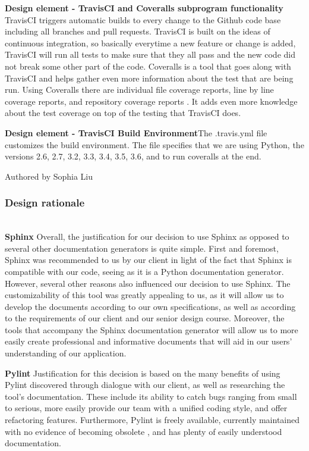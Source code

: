 \documentclass[onecolumn, draftclsnofoot,10pt, compsoc]{IEEEtran}
\begin{document}
\begin{flushleft}
\medskip

\textbf{Design element - TravisCI and Coveralls subprogram functionality} TravisCI triggers automatic builds to every change to the Github code base including all branches and pull requests. TravisCI is built on the ideas of continuous integration, so basically everytime a new feature or change is added, TravisCI will run all tests to make sure that they all pass and the new code did not break some other part of the code\cite{15}. Coveralls is a tool that goes along with TravisCI and helps gather even more information about the test that are being run. Using Coveralls there are individual file coverage reports, line by line coverage reports, and repository coverage reports \cite{16}. It adds even more knowledge about the test coverage on top of the testing that TravisCI does.

\medskip

\textbf{Design element -  TravisCI Build Environment}The .travis.yml file customizes the build environment\cite{15}. The file specifies that we are using Python, the versions 2.6, 2.7, 3.2, 3.3, 3.4, 3.5, 3.6, and to run coveralls at the end.

\smallskip

\footnotesize Authored by Sophia Liu
\normalsize

\bigskip

\subsubsection{Design rationale} \ \\
\textbf{Sphinx} Overall, the justification for our decision to use Sphinx as opposed to several other documentation generators is quite simple. First and foremost, Sphinx was recommended to us by our client in light of the fact that Sphinx is compatible with our code, seeing as it is a Python documentation generator. However, several other reasons also influenced our decision to use Sphinx. The customizability of this tool was greatly appealing to us, as it will allow us to develop the documents according to our own specifications, as well as according to the requirements of our client and our senior design course. Moreover, the tools that accompany the Sphinx documentation generator will allow us to more easily create professional and informative documents that will aid in our users’ understanding of our application.

\medskip

\textbf{Pylint } Justification for this decision is based on the many benefits of using Pylint discovered through dialogue with our client, as well as researching the tool's documentation. These include its ability to catch bugs ranging from small to serious, more easily provide our team with a unified coding style, and offer refactoring features. Furthermore, Pylint is freely available, currently maintained with no evidence of becoming obsolete \cite{20}, and has plenty of easily understood documentation. \cite{6} 


\end{flushleft}
\end{document}
